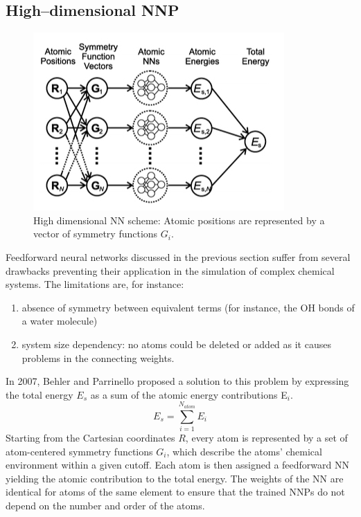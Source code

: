\documentclass[12pt]{article}
\begin{document}
\subsection{High--dimensional NNP}
\begin{figure}[!htp]
    \centering
    \includegraphics[scale=0.7]{latex_files/High-dimensional-NNP_scheme.jpeg}
    \caption{High dimensional NN scheme: Atomic positions are represented by a vector of symmetry functions $G_i$. }
    \label{High-dimensional-NNP_scheme}
\end{figure}
Feedforward neural networks discussed in the previous section suffer from several drawbacks preventing their application in the simulation of complex chemical systems. The limitations are, for instance:
\begin{enumerate}
    \item absence of symmetry between equivalent terms (for instance, the OH bonds of a water molecule)
    \item system size dependency: no atoms could be deleted or added as it causes problems in the connecting weights.
\end{enumerate}
In 2007, Behler and Parrinello proposed a solution to this problem by expressing the total energy $E_s$ as a sum of the atomic energy contributions E$_i$.\cite{Behler2007}
\begin{equation}
    E_s = \sum_{i=1}^{N_{atom}} E_i
\end{equation}
Starting from the Cartesian coordinates $R$, every atom is represented by a set of atom-centered symmetry functions $G_i$, which describe the atoms' chemical environment within a given cutoff. Each atom is then assigned a feedforward NN yielding the atomic contribution to the total energy. The weights of the NN are identical for atoms of the same element to ensure that the trained NNPs do not depend on the number and order of the atoms.
%
\end{document}
